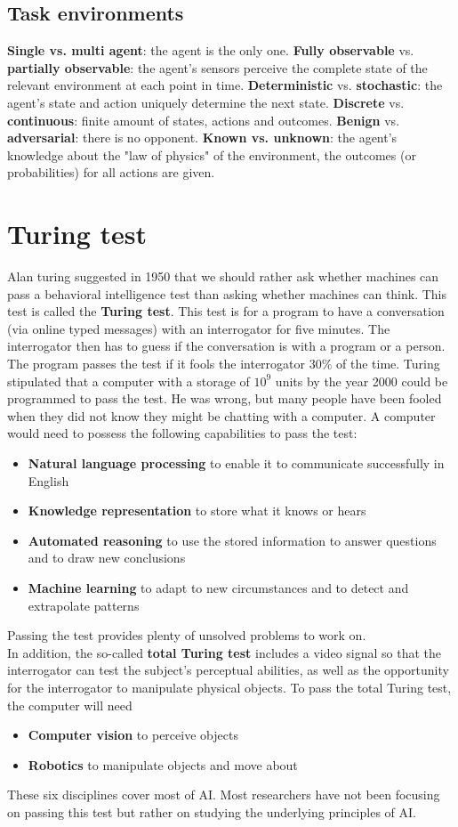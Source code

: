 \documentclass{report}
\begin{document}
\subsection{Task environments}
{\bf Single vs. multi agent}: the agent is the only one. {\bf Fully observable} vs. {\bf partially observable}: the agent's sensors perceive the complete state of the relevant environment at each point in time. {\bf Deterministic} vs. {\bf stochastic}: the agent's state and action uniquely determine the next state. {\bf Discrete} vs. {\bf continuous}: finite amount of states, actions and outcomes. {\bf Benign} vs. {\bf adversarial}: there is no opponent. {\bf Known vs. unknown}: the agent's knowledge about the "law of physics" of the environment, the outcomes (or probabilities) for all actions are given.

\section{Turing test}
Alan turing suggested in 1950 that we should rather ask whether machines can pass a behavioral intelligence test than asking whether machines can think.
This test is called the {\bf Turing test}. This test is for a program to have a conversation (via online typed messages) with an interrogator for five minutes. The interrogator then has to guess if the conversation is with a program or a person. The program passes the test if it fools the interrogator 30\% of the time.
Turing stipulated that a computer with a storage of $10^9$ units by the year 2000 could be programmed to pass the test.
He was wrong, but many people have been fooled when they did not know they might be chatting with a computer.
A computer would need to possess the following capabilities to pass the test:
\begin{itemize}
\item {\bf Natural language processing} to enable it to communicate successfully in English
\item {\bf Knowledge representation} to store what it knows or hears
\item {\bf Automated reasoning} to use the stored information to answer questions and to draw new conclusions
\item {\bf Machine learning} to adapt to new circumstances and to detect and extrapolate patterns
\end{itemize}
Passing the test provides plenty of unsolved problems to work on.\\
In addition, the so-called {\bf total Turing test} includes a video signal so that the interrogator can test the subject's perceptual abilities, as well as the opportunity for the interrogator to manipulate physical objects.
To pass the total Turing test, the computer will need
\begin{itemize}
\item {\bf Computer vision} to perceive objects
\item {\bf Robotics} to manipulate objects and move about
\end{itemize}
These six disciplines cover most of AI. Most researchers have not been focusing on passing this test but rather on studying the underlying principles of AI.
\end{document}
